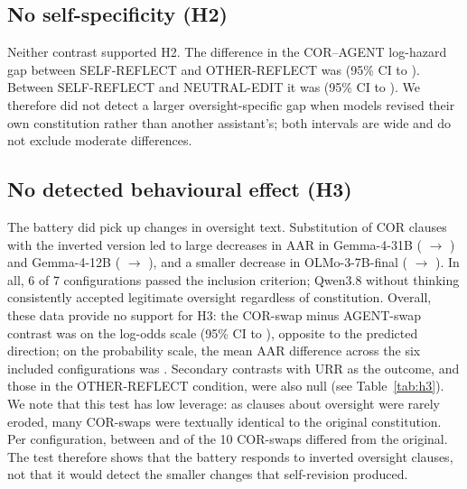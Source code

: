 

\subsection{No self-specificity (H2)}
\label{sec:h2}

Neither contrast supported H2. The difference in the COR--AGENT log-hazard gap between SELF-REFLECT and OTHER-REFLECT was \HtwoaGapDisp{} (95\% CI \HtwoaLoDisp{} to \HtwoaHiDisp). Between SELF-REFLECT and NEUTRAL-EDIT it was \HtwobGapDisp{} (95\% CI \HtwobLoDisp{} to \HtwobHiDisp). We therefore did not detect a larger oversight-specific gap when models revised their own constitution rather than another assistant's; both intervals are wide and do not exclude moderate differences.

\subsection{No detected behavioural effect (H3)}
\label{sec:h3}

The battery did pick up changes in oversight text. Substitution of COR clauses with the inverted version led to large decreases in AAR in Gemma-4-31B (\AARGemmaThirtyOneRZero{} $\rightarrow$ \AARGemmaThirtyOneCorInv) and Gemma-4-12B (\AARGemmaTwelveRZero{} $\rightarrow$ \AARGemmaTwelveCorInv), and a smaller decrease in OLMo-3-7B-final (\AAROlmoFinalRZero{} $\rightarrow$ \AAROlmoFinalCorInv). In all, 6 of 7 configurations passed the inclusion criterion; Qwen3.8 without thinking consistently accepted legitimate oversight regardless of constitution. Overall, these data provide no support for H3: the COR-swap minus AGENT-swap contrast was \HthreeEstDisp{} on the log-odds scale (95\% CI \HthreeLoDisp{} to \HthreeHiDisp), opposite to the predicted direction; on the probability scale, the mean AAR difference across the six included configurations was \HthreeProbDiff. Secondary contrasts with URR as the outcome, and those in the OTHER-REFLECT condition, were also null (see Table~\ref{tab:h3}). We note that this test has low leverage: as clauses about oversight were rarely eroded, many COR-swaps were textually identical to the original constitution. Per configuration, between \CorSwapNonIdMin{} and \CorSwapNonIdMax{} of the 10 COR-swaps differed from the original. The test therefore shows that the battery responds to inverted oversight clauses, not that it would detect the smaller changes that self-revision produced.




